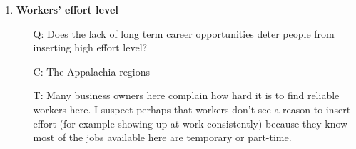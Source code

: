 \documentclass[12pt]{article}
\begin{document}
\begin{enumerate}
	\item \textbf{Workers' effort level}
		\begin{itemize}
			\item[Q:] Does the lack of long term career opportunities deter people from inserting high effort level?
			\item[C:] The Appalachia regions
			\item[T:] Many business owners here complain how hard it is to find reliable workers here. I suspect perhaps that workers don't see a reason to insert effort (for example showing up at work consistently) because they know most of the jobs available here are temporary or part-time.
		\end{itemize}






\end{enumerate}
\end{document}
